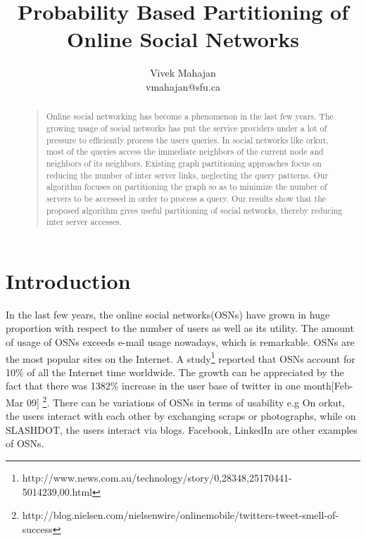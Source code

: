 \documentclass[letterpaper]{article}
\begin{document}
%
\title{Probability Based Partitioning of Online Social Networks}
\author{Vivek Mahajan\\
vmahajan@sfu.ca\\
}
\maketitle
\begin{abstract}
\begin{quote}
Online social networking has  become a phenomenon in the last
few years. The growing usage of social networks has put the service providers
under a lot of pressure to efficiently process the users queries.
 In social networks like orkut, most of the queries access the immediate neighbors of the current node and
neighbors of its neighbors.  Existing graph partitioning approaches focus on reducing the number
 of inter server links, neglecting the query
patterns. Our algorithm focuses on partitioning the graph so as to
minimize the number of servers to be accessed in order to
 process a query. Our results show that the proposed algorithm gives useful partitioning of social networks,
thereby reducing inter server accesses.


\end{quote}
\end{abstract}

\section{Introduction}
    In the last few years, the online social networks(OSNs) have grown in huge proportion with respect to the number of users as well as its utility. The amount of usage of OSNs exceeds e-mail usage nowadays, which is remarkable.
 OSNs are the most popular sites on the Internet. A study\footnote{http://www.news.com.au/technology/story/0,28348,25170441-5014239,00.html} reported that OSNs account for 10\% of all the Internet time worldwide. The growth can be appreciated by the fact that there was 1382\% increase in the user base of twitter in one month[Feb-Mar 09] \footnote{http://blog.nielsen.com/nielsenwire/onlinemobile/twitters-tweet-smell-of-success}.
There can be variations of OSNs in terms of usability e.g On orkut, the users interact with each other by exchanging scraps or photographs, while on SLASHDOT, the users interact via blogs. Facebook, LinkedIn are other examples of OSNs.
\end{document}
